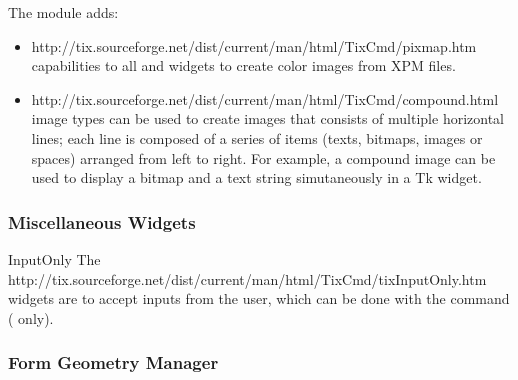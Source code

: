 The  module adds:
\begin{itemize}
\item 
{}
{http://tix.sourceforge.net/dist/current/man/html/TixCmd/pixmap.htm}
capabilities to all  and  widgets to
create color images from XPM files.



\item
{}
{http://tix.sourceforge.net/dist/current/man/html/TixCmd/compound.html}
image types can be used to create images that consists of multiple
horizontal lines; each line is composed of a series of items (texts,
bitmaps, images or spaces) arranged from left to right. For example, a
compound image can be used to display a bitmap and a text string
simutaneously in a Tk  widget.




\end{itemize}


\subsubsection{Miscellaneous Widgets}

\begin{classdesc}{InputOnly}{}
The 
{http://tix.sourceforge.net/dist/current/man/html/TixCmd/tixInputOnly.htm}
widgets are to accept inputs from the user, which can be done with the
 command (\UNIX{} only).
\end{classdesc}

\subsubsection{Form Geometry Manager}

